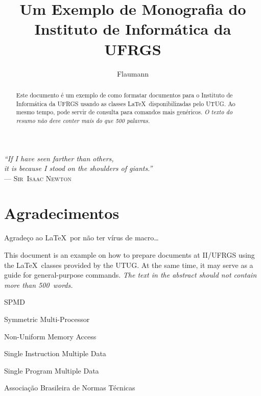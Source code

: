 \documentclass[ppgc,ti]{iiufrgs}
\title{Um Exemplo de Monografia do Instituto de Informática da UFRGS}
\author{Flaumann}{Fritz Gutenberg}
\begin{document}
\maketitle

\clearpage
\begin{flushright}
\mbox{}\vfill
{\sffamily\itshape
``If I have seen farther than others,\\
it is because I stood on the shoulders of giants.''\\}
--- \textsc{Sir~Isaac Newton}
\end{flushright}

\chapter*{Agradecimentos}
Agradeço ao \LaTeX\ por não ter vírus de macro\ldots



\begin{abstract}
Este documento é um exemplo de como formatar documentos para o
Instituto de Informática da UFRGS usando as classes \LaTeX\
disponibilizadas pelo UTUG\@. Ao mesmo tempo, pode servir de consulta
para comandos mais genéricos. \emph{O texto do resumo não deve
conter mais do que 500 palavras.}
\end{abstract}

\begin{translatedabstract}
This document is an example on how to prepare documents at II/UFRGS
using the \LaTeX\ classes provided by the UTUG\@. At the same time, it
may serve as a guide for general-purpose commands. \emph{The text in
the abstract should not contain more than 500~words.}
\end{translatedabstract}

\begin{listofabbrv}{SPMD}
        \item[SMP] Symmetric Multi-Processor
        \item[NUMA] Non-Uniform Memory Access
        \item[SIMD] Single Instruction Multiple Data
        \item[SPMD] Single Program Multiple Data
        \item[ABNT] Associação Brasileira de Normas Técnicas
\end{listofabbrv}
\end{document}
